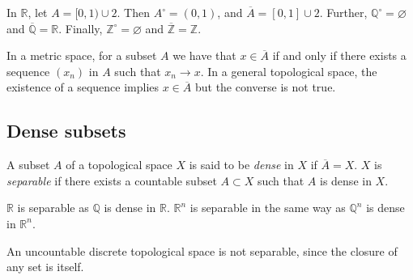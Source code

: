 \begin{example}
	In \( \mathbb R \), let \( A = [0,1) \cup \qty{2} \).
	Then \( A^\circ = (0,1) \), and \( \overline A = [0,1] \cup \qty{2} \).
	Further, \( \mathbb Q^\circ = \varnothing \) and \( \overline {\mathbb Q} = \mathbb R \).
	Finally, \( \mathbb Z^\circ = \varnothing \) and \( \overline {\mathbb Z} = \mathbb Z \).
\end{example}
\begin{remark}
	In a metric space, for a subset \( A \) we have that \( x \in \overline A \) if and only if there exists a sequence \( (x_n) \) in \( A \) such that \( x_n \to x \).
	In a general topological space, the existence of a sequence implies \( x \in \overline A \) but the converse is not true.
\end{remark}

\subsection{Dense subsets}
\begin{definition}
	A subset \( A \) of a topological space \( X \) is said to be \textit{dense} in \( X \) if \( \overline A = X \).
	\( X \) is \textit{separable} if there exists a countable subset \( A \subset X \) such that \( A \) is dense in \( X \).
\end{definition}
\begin{example}
	\( \mathbb R \) is separable as \( \mathbb Q \) is dense in \( \mathbb R \).
	\( \mathbb R^n \) is separable in the same way as \( \mathbb Q^n \) is dense in \( \mathbb R^n \).
\end{example}
\begin{example}
	An uncountable discrete topological space is not separable, since the closure of any set is itself.
\end{example}


